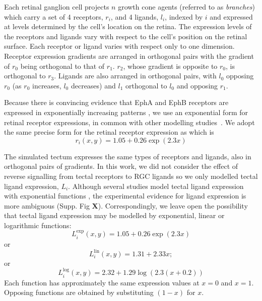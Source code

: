 \documentclass[11pt, a4paper]{article}
\begin{document}
Each retinal ganglion cell projects $n$ growth cone agents (referred to
as \emph{branches}) which carry a set of 4 receptors, $r_i$, and 4 ligands,
$l_i$, indexed by $i$ and
expressed at levels determined by the cell's location on the retina. The
expression levels of the receptors and ligands vary with respect to the cell's
position on the retinal surface. Each receptor or ligand varies with respect
only to one dimension.  Receptor expression gradients are arranged in
orthogonal pairs with the gradient of $r_0$ being orthogonal to that of
$r_1$. $r_2$, whose gradient is opposite to $r_0$, is orthogonal to
$r_3$. Ligands are also arranged in orthogonal pairs, with $l_0$ opposing
$r_0$ (as $r_0$ increases, $l_0$ decreases) and $l_1$ orthogonal to $l_0$ and
opposing $r_1$.

Because there is convincing evidence that EphA and EphB receptors are
expressed in exponentially increasing
patterns \citep{reber_relative_2004,feldheim_genetic_2000,brown_topographic_2000,koulakov_stochastic_2004},
we use an exponential form for retinal receptor expressions, in common with
other modelling
studies~\citep{reber_relative_2004,koulakov_stochastic_2004,simpson_simple_2011}.
We adopt the same precise form for the retinal receptor expression
as \citet{simpson_simple_2011} which is
\begin{equation}
r_i(x,y) = 1.05 + 0.26 \exp(2.3 x)
\end{equation}

The simulated tectum expresses the same types of receptors and ligands, also
in orthogonal pairs of gradients. In this work, we did not consider the effect
of reverse signalling from tectal receptors to RGC ligands so we only modelled
tectal ligand expression, $L_i$. Although several studies model tectal ligand
expression with exponential functions \citep{koulakov_stochastic_2004}, the
experimental evidence for ligand expression is more ambiguous (Supp. Fig
\textbf{X}). Correspondingly, we leave open the possibility that tectal ligand
expression may be modelled by exponential, linear or logarithmic functions:
\begin{equation} \label{e:tecexp}
L_i^{\text{exp}}(x,y) = 1.05 + 0.26 \exp(2.3 x)
\end{equation}
or
\begin{equation}
L_i^{\text{lin}}(x,y) = 1.31 + 2.33 x;
\end{equation}
or
\begin{equation}
L_i^{\text{log}}(x,y) = 2.32 + 1.29 \log (2.3(x+0.2))
\end{equation}
Each function has approximately the same expression values at $x=0$ and
$x=1$. Opposing functions are obtained by substituting $(1-x)$ for $x$.
\end{document}
